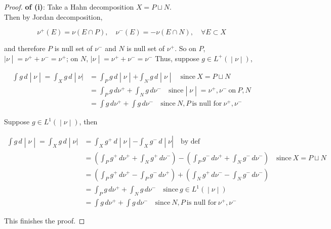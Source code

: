 \documentclass{qlnotes-export}
\begin{document}
\begin{proof}

\textbf{of (i)}: Take a Hahn decomposition \(X = P \sqcup N\).\\
Then by Jordan decomposition,

\[\nu^{+}(E) = \nu(E \cap P),\quad\nu^{-}(E) = - \nu(E \cap N),\quad\forall E \subset X\]

and therefore \(P\) is null set of \(\nu^{-}\) and \(N\) is null set of \(\nu^{+}\). So on \(P\), \(\left. |\nu \middle| = \nu^{+} + \nu^{-} = \nu^{+} \right.\); on \(N\), \(\left. |\nu \middle| = \nu^{+} + \nu^{-} = \nu^{-} \right.\) Thus, suppose \(\left. g \in L^{+}( \middle| \nu \middle| ) \right.\),

\[\begin{matrix}
\left. \int g\, d \middle| \nu \middle| = \int_{X}g\, d \middle| \nu| \right. & \left. = \int_{P}g\, d \middle| \nu \middle| + \int_{N}g\, d \middle| \nu \middle| \quad\text{since}\ X = P \sqcup N \right. \\
 & \left. = \int_{P}g\, d\nu^{+} + \int_{N}g\, d\nu^{-}\quad\text{since} \middle| \nu \middle| = \nu^{+},\nu^{-}\ \text{on}\ P,N \right. \\
 & {= \int g\, d\nu^{+} + \int g\, d\nu^{-}\quad\text{since}\ N,P\ \text{is null for}\ \nu^{+},\nu^{-}}
\end{matrix}\]

Suppose \(\left. g \in L^{1}( \middle| \nu \middle| ) \right.\), then

\[\begin{matrix}
\left. \int g\, d \middle| \nu \middle| = \int_{X}g\, d \middle| \nu| \right. & {\left. = \int_{X}g^{+}\, d \middle| \nu \middle| - \int_{X}g^{-}\, d \middle| \nu \right|\quad\text{by def}} \\
 & {= (\int_{P}g^{+}\, d\nu^{+} + \int_{N}g^{+}\, d\nu^{-}) - (\int_{P}g^{-}\, d\nu^{+} + \int_{N}g^{-}\, d\nu^{-})\quad\text{since}\ X = P \sqcup N} \\
 & {= (\int_{P}g^{+}\, d\nu^{+} - \int_{P}g^{-}\, d\nu^{+}) + (\int_{N}g^{+}\, d\nu^{-} - \int_{N}g^{-}\, d\nu^{-})} \\
 & \left. = \int_{P}g\, d\nu^{+} + \int_{N}g\, d\nu^{-}\quad\text{since}\ g \in L^{1}( \middle| \nu \middle| ) \right. \\
 & {= \int g\, d\nu^{+} + \int g\, d\nu^{-}\quad\text{since}\ N,P\ \text{is null for}\ \nu^{+},\nu^{-}}
\end{matrix}\]

This finishes the proof.

\end{proof}
\end{document}
